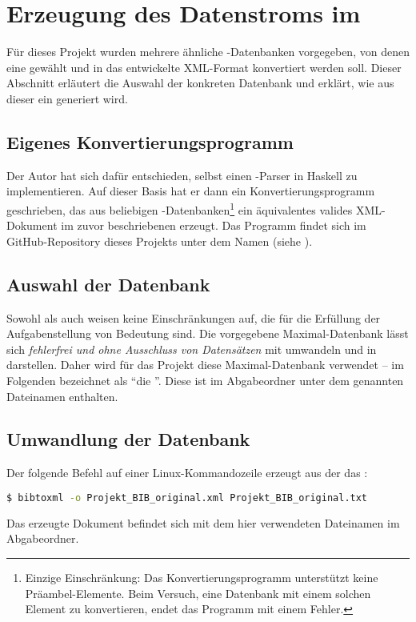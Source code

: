 \section{Erzeugung des Datenstroms im \BibTeXXMLformat}

Für dieses Projekt wurden mehrere ähnliche \mbox{\BibTeX-}Datenbanken
vorgegeben, von denen eine gewählt und in das entwickelte XML-Format konvertiert
werden soll. Dieser Abschnitt erläutert die Auswahl der konkreten Datenbank und
erklärt, wie aus dieser ein \BibTeXXMLdoc{} generiert wird.

\subsection{Eigenes Konvertierungsprogramm}

\def\temp{%
    Einzige Einschränkung: Das Konvertierungsprogramm unterstützt keine
    Präambel-Elemente. Beim Versuch, eine Datenbank mit einem solchen Element zu
    konvertieren, endet das Programm mit einem Fehler.%
}

Der Autor hat sich dafür entschieden, selbst einen \mbox{\BibTeX-}Parser in
Haskell zu implementieren. Auf dieser Basis hat er dann ein
Konvertierungsprogramm geschrieben, das aus beliebigen
\mbox{\BibTeX-}Datenbanken\footnote{\temp} ein äquivalentes valides XML-Dokument
im zuvor beschriebenen \BibTeXXMLformat{} erzeugt. Das Programm findet sich im
GitHub-Repository dieses Projekts unter dem Namen  (siehe
\cite{github-bibtex-xml}).

\subsection{Auswahl der Datenbank}

Sowohl \BibTeXXML{} als auch  weisen keine Einschränkungen auf,
die für die Erfüllung der Aufgabenstellung von Bedeutung sind. Die vorgegebene
Maximal-Datenbank  lässt sich \emph{fehlerfrei
und ohne Ausschluss von Datensätzen} mit  umwandeln und in
\BibTeXXML{} darstellen. Daher wird für das Projekt diese Maximal-Datenbank
verwendet -- im Folgenden bezeichnet als \enquote{die \BibTeXdatabase}.
Diese ist im Abgabeordner unter dem genannten Dateinamen enthalten.

\subsection{Umwandlung der Datenbank}

\begin{flushleft}
Der folgende Befehl auf einer Linux-Kommandozeile erzeugt aus der  \BibTeXdatabase{} das \BibTeXXMLdoc{} :
\end{flushleft}
\begin{lstlisting}[language=bash]
$ bibtoxml -o Projekt_BIB_original.xml Projekt_BIB_original.txt
\end{lstlisting}
Das erzeugte Dokument befindet sich mit dem hier verwendeten Dateinamen im
Abgabeordner.
